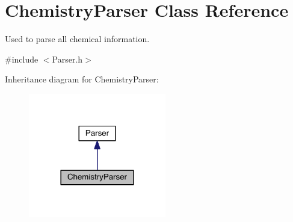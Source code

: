 \hypertarget{classChemistryParser}{\section{Chemistry\+Parser Class Reference}
\label{classChemistryParser}
}


Used to parse all chemical information.  




{\ttfamily \#include $<$Parser.\+h$>$}



Inheritance diagram for Chemistry\+Parser\+:\nopagebreak
\begin{figure}[H]
\begin{center}
\leavevmode
\includegraphics[width=170pt]{classChemistryParser__inherit__graph}
\end{center}
\end{figure}


